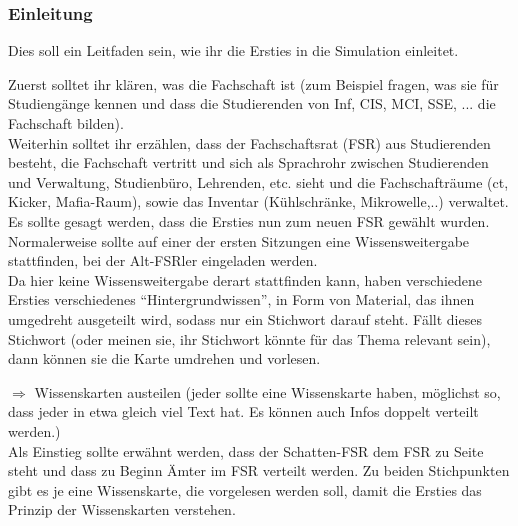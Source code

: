 \documentclass[a4paper,11pt]{scrartcl} %
\begin{document}
\subsubsection{Einleitung}
{
Dies soll ein Leitfaden sein, wie ihr die Ersties in die Simulation 
einleitet.

Zuerst solltet ihr klären, was die Fachschaft ist (zum Beispiel fragen, 
was sie für Studiengänge kennen und dass die Studierenden von Inf, CIS, 
MCI, SSE, ... die Fachschaft bilden).\\
Weiterhin solltet ihr erzählen, dass der Fachschaftsrat (FSR)
aus Studierenden besteht,  
die Fachschaft vertritt und sich als Sprachrohr zwischen Studierenden und
Verwaltung, Studienbüro, Lehrenden, etc. sieht und 
die Fachschafträume (ct, Kicker, Mafia-Raum), sowie das Inventar 
(Kühlschränke, Mikrowelle,..) verwaltet. \\

Es sollte gesagt werden, dass die Ersties nun zum neuen FSR gewählt
wurden. Normalerweise sollte auf einer der ersten Sitzungen eine 
Wissensweitergabe stattfinden, bei der Alt-FSRler
eingeladen werden. \\
Da hier keine Wissensweitergabe derart stattfinden kann, haben
verschiedene Ersties verschiedenes "`Hintergrundwissen"', in Form von 
Material, das ihnen umgedreht ausgeteilt wird, sodass nur ein Stichwort
darauf steht. Fällt dieses Stichwort (oder meinen sie, ihr Stichwort 
könnte für das Thema relevant sein), dann können sie die Karte
umdrehen und vorlesen. 

$\Rightarrow$ Wissenskarten austeilen (jeder sollte
eine Wissenskarte haben, möglichst so, dass jeder in etwa
gleich viel Text hat. Es können auch Infos doppelt verteilt werden.) \\

Als Einstieg sollte erwähnt werden, dass der Schatten-FSR
dem FSR zu Seite steht und dass zu Beginn Ämter im FSR
verteilt werden. Zu beiden Stichpunkten gibt es je eine Wissenskarte,
die vorgelesen werden soll, damit die Ersties das Prinzip der
Wissenskarten verstehen.
}
\end{document}
